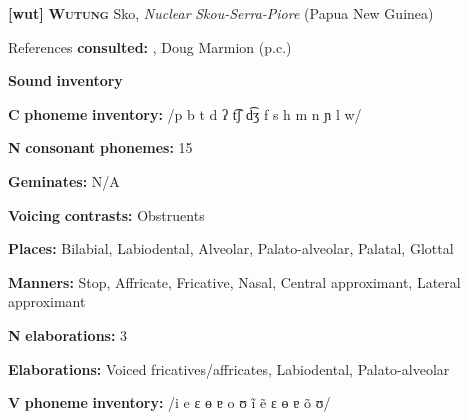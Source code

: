 \documentclass[output=paper]{langsci/langscibook}
\begin{document}
\begin{styleBody}
\textbf{[wut]}   \textbf{\textsc{Wutung}}  Sko, \textit{Nuclear} \textit{Skou-Serra-Piore} (Papua New Guinea)
\end{styleBody}

\begin{styleBody}
References \textbf{consulted:} \citet{Marmion2010}, Doug Marmion (p.c.)
\end{styleBody}

\begin{styleBody}
\textbf{Sound} \textbf{inventory}
\end{styleBody}

\begin{styleBody}
\textbf{C} \textbf{phoneme} \textbf{inventory:} /p b t d ʔ t͡ʃ d͡ʒ f s h m n ɲ l w/
\end{styleBody}

\begin{styleBody}
\textbf{N} \textbf{consonant} \textbf{phonemes:} 15
\end{styleBody}

\begin{styleBody}
\textbf{Geminates:} N/A
\end{styleBody}

\begin{styleBody}
\textbf{Voicing} \textbf{contrasts:} Obstruents
\end{styleBody}

\begin{styleBody}
\textbf{Places:} Bilabial, Labiodental, Alveolar, Palato-alveolar, Palatal, Glottal
\end{styleBody}

\begin{styleBody}
\textbf{Manners:} Stop, Affricate, Fricative, Nasal, Central approximant, Lateral approximant
\end{styleBody}

\begin{styleBody}
\textbf{N} \textbf{elaborations:} 3
\end{styleBody}

\begin{styleBody}
\textbf{Elaborations:} Voiced fricatives/affricates, Labiodental, Palato-alveolar
\end{styleBody}

\begin{styleBody}
\textbf{V} \textbf{phoneme} \textbf{inventory:} /i e ɛ ɵ ɐ o ʊ ĩ ẽ ɛ ɵ ɐ õ ʊ/
\end{styleBody}
\end{document}
